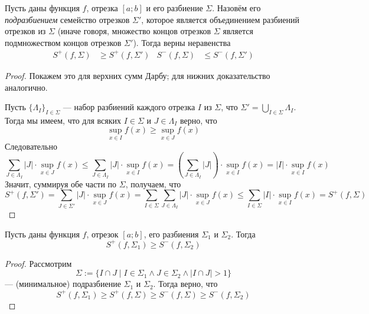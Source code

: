 \documentclass[12pt,a4paper]{article}
\begin{document}
    \begin{lemma}
        Пусть даны функция $f$, отрезка $[a; b]$ и его разбиение $\Sigma$. Назовём его \emph{подразбиением} семейство отрезков $\Sigma'$, которое является объединением разбиений отрезков из $\Sigma$ (иначе говоря, множество концов отрезков $\Sigma$ является подмножеством концов отрезков $\Sigma'$). Тогда верны неравенства
        \begin{align*}
            S^+(f, \Sigma) &\geqslant S^+(f, \Sigma')&
            S^-(f, \Sigma) &\leqslant S^-(f, \Sigma')
        \end{align*}
    \end{lemma}

    \begin{proof}
        Покажем это для верхних сумм Дарбу; для нижних доказательство аналогично.

        Пусть $\{\Lambda_I\}_{I \in \Sigma}$ --- набор разбиений каждого отрезка $I$ из $\Sigma$, что $\Sigma' = \bigcup_{I \in \Sigma} \Lambda_I$. Тогда мы имеем, что для всяких $I \in \Sigma$ и $J \in \Lambda_I$ верно, что
        \[\sup_{x \in I} f(x) \geqslant \sup_{x \in J} f(x)\]
        Следовательно
        \[
            \sum_{J \in \Lambda_I} |J| \cdot \sup_{x \in J} f(x)
            \leqslant \sum_{J \in \Lambda_I} |J| \cdot \sup_{x \in I} f(x)
            = \left(\sum_{J \in \Lambda_I} |J|\right) \cdot \sup_{x \in I} f(x)
            = |I| \cdot \sup_{x \in I} f(x)
        \]
        Значит, суммируя обе части по $\Sigma$, получаем, что
        \[
            S^+(f, \Sigma')
            = \sum_{J \in \Sigma'} |J| \cdot \sup_{x \in J} f(x)
            = \sum_{I \in \Sigma} \sum_{J \in \Lambda_I} |J| \cdot \sup_{x \in J} f(x)
            \leqslant \sum_{I \in \Sigma} |I| \cdot \sup_{x \in I} f(x)
            = S^+(f, \Sigma)
        \]
    \end{proof}

    \begin{lemma}
        Пусть даны функция $f$, отрезок $[a; b]$, его разбиения $\Sigma_1$ и $\Sigma_2$. Тогда
        \[S^+(f, \Sigma_1) \geqslant S^-(f, \Sigma_2)\]
    \end{lemma}

    \begin{proof}
        Рассмотрим
        \[\Sigma := \{I \cap J \mid I \in \Sigma_1 \wedge J \in \Sigma_2 \wedge |I \cap J| > 1\}\]
        --- (минимальное) подразбиение $\Sigma_1$ и $\Sigma_2$. Тогда верно, что
        \[S^+(f, \Sigma_1) \geqslant S^+(f, \Sigma) \geqslant S^-(f, \Sigma) \geqslant S^-(f, \Sigma_2)\]
    \end{proof}
\end{document}
